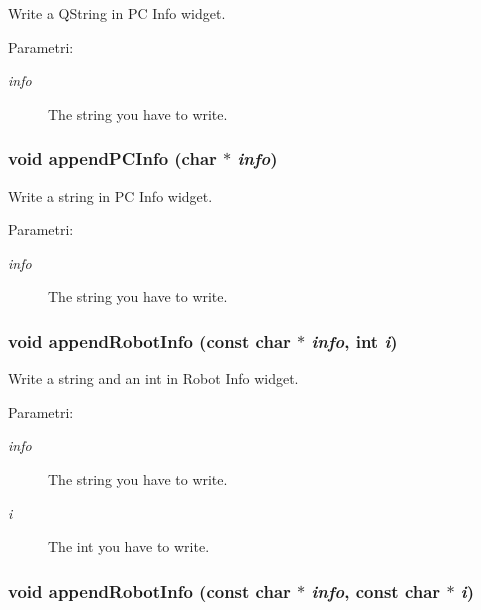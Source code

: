 Write a QString in PC Info widget. \begin{Desc}
\item[Parametri:]
\begin{description}
\item[{\em info}]The string you have to write. \end{description}
\end{Desc}
\hypertarget{classMainWindow_64f8e53725a778a11501dadf09b8c042}{
\subsubsection[appendPCInfo]{\setlength{\rightskip}{0pt plus 5cm}void append\-PCInfo (char $\ast$ {\em info})}}
\label{classMainWindow_64f8e53725a778a11501dadf09b8c042}


Write a string in PC Info widget. \begin{Desc}
\item[Parametri:]
\begin{description}
\item[{\em info}]The string you have to write. \end{description}
\end{Desc}
\hypertarget{classMainWindow_8f842edf62781c42283434f16760a307}{
\subsubsection[appendRobotInfo]{\setlength{\rightskip}{0pt plus 5cm}void append\-Robot\-Info (const char $\ast$ {\em info}, int {\em i})}}
\label{classMainWindow_8f842edf62781c42283434f16760a307}


Write a string and an int in Robot Info widget. \begin{Desc}
\item[Parametri:]
\begin{description}
\item[{\em info}]The string you have to write. \item[{\em i}]The int you have to write. \end{description}
\end{Desc}
\hypertarget{classMainWindow_74763de0eb539f0af358d83a82588fbb}{
\subsubsection[appendRobotInfo]{\setlength{\rightskip}{0pt plus 5cm}void append\-Robot\-Info (const char $\ast$ {\em info}, const char $\ast$ {\em i})}}
\label{classMainWindow_74763de0eb539f0af358d83a82588fbb}


